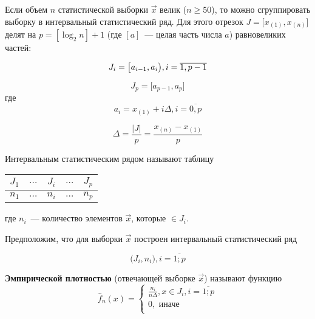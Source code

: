 Если объем $n$ статистической выборки $\vec x$ велик ($n \geq 50$), то можно сгруппировать выборку в интервальный статистический ряд. Для этого отрезок $J = \big[ x_{(1)}, x_{(n)} \big]$ делят на $p = [\log_2n] + 1$ (где $[a]$~--- целая часть числа $a$) равновеликих частей:

\begin{equation*}
    J_i = \big[ a_{i-1}, a_i \big), i = \overline{1, p-1} \\
\end{equation*}

\begin{equation*}
    J_{p} = \big[ a_{p-1}, a_p \big]
\end{equation*}
где
\begin{equation*}
    a_i = x_{(1)} + i\Delta, i = \overline{0, p}
\end{equation*}

\begin{equation*}
    \Delta = \frac{|J|}{p} = \frac{x_{(n)} - x_{(1)}}{p}
\end{equation*}

Интервальным статистическим рядом называют таблицу

\begin{table}[H]
    \centering
    \begin{tabular}{ccccc}
        \toprule
        $J_1$ & $\dots$ & $J_i$ & $\dots$ & $J_p$ \\
        \midrule
        $n_1$ & $\dots$ & $n_i$ & $\dots$ & $n_p$ \\
        \bottomrule
    \end{tabular}
\end{table}
где $n_i$~--- количество элементов $\vec x$, которые $\in J_i$.

Предположим, что для выборки $\vec x$ построен интервальный статистический
ряд

\begin{equation*}
    \big( J_i, n_i \big), i = \overline{1; p}
\end{equation*}

\textbf{Эмпирической плотностью} (отвечающей выборке $\vec x$) называют функцию
\begin{equation*}
    \hat f_n(x) =
    \begin{cases}
        \frac{n_i}{n \Delta}, x \in J_i, i = \overline{1; p} \\
        0, \text{ иначе} \\
    \end{cases}
\end{equation*}

